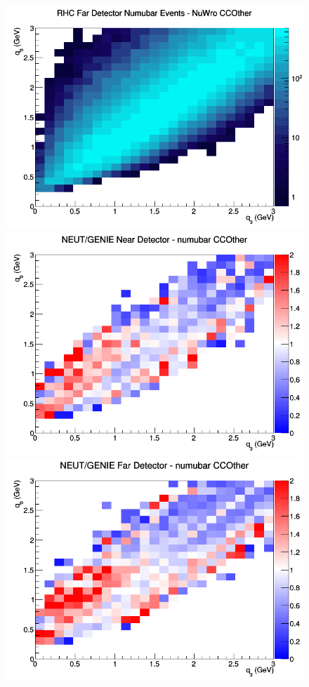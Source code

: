 \begin{figure}[h]
\endminipage
{}
\includegraphics[width=\linewidth]{eff_q0_q3/GAr/CCOther_RHC_FD_numubar_q3_q0_NuWro.png}
\endminipage
\newline
{}
\includegraphics[width=\linewidth]{eff_q0_q3/GAr/ratios/CCOther_NEUT_GENIE_numubar_near_q3_q0.png}
\endminipage
{}
\includegraphics[width=\linewidth]{eff_q0_q3/GAr/ratios/CCOther_NEUT_GENIE_numubar_far_q3_q0.png}

\end{figure}
